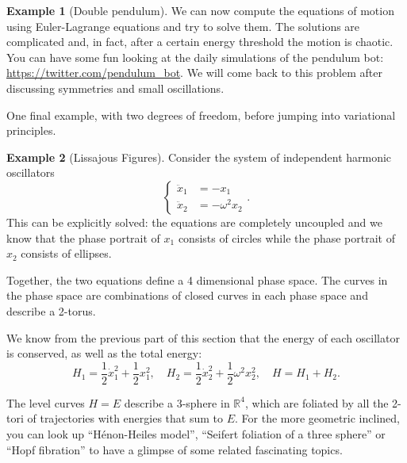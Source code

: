 \documentclass[english,fontsize=11pt,paper=b5]{scrbook}
\numberwithin{equation}{chapter}
\theoremstyle{definition}
\newtheorem{example}{Example}[chapter]
\begin{document}
\begin{example}[Double pendulum]
      We can now compute the equations of motion using Euler-Lagrange equations and try to solve them.
      The solutions are complicated and, in fact, after a certain energy threshold the motion is chaotic.
      You can have some fun looking at the daily simulations of the pendulum bot: \url{https://twitter.com/pendulum_bot}.
      We will come back to this problem after discussing symmetries and small oscillations.
    \end{example}

    One final example, with two degrees of freedom, before jumping into variational principles.

    \begin{example}[Lissajous Figures]\label{exa:lissajous}
      Consider the system of independent harmonic oscillators
      \begin{equation}
        \left\lbrace
          \begin{aligned}
            \ddot x_1 & = -x_1          \\
            \ddot x_2 & = -\omega^2 x_2
          \end{aligned}
        \right..
      \end{equation}
      This can be explicitly solved: the equations are completely uncoupled and we know that the phase portrait of $x_1$ consists of circles while the phase portrait of $x_2$ consists of ellipses.

      Together, the two equations define a 4 dimensional phase space. The curves in the phase space are combinations of closed curves in each phase space and describe a 2-torus.

      We know from the previous part of this section that the energy of each oscillator is conserved, as well as the total energy:
      \begin{equation}
        H_1 = \frac12\dot x_1^2 + \frac12 x_1^2, \quad
        H_2 = \frac12\dot x_2^2 + \frac12 \omega^2 x_2^2, \quad
        H = H_1 + H_2.
      \end{equation}

      The level curves $H=E$ describe a 3-sphere in $\mathbb{R}^4$, which are foliated by all the 2-tori of trajectories with energies that sum to $E$. For the more geometric inclined, you can look up ``H\'enon-Heiles model'', ``Seifert foliation of a three sphere'' or ``Hopf fibration'' to have a glimpse of some related fascinating topics.


\end{example}
\end{document}
